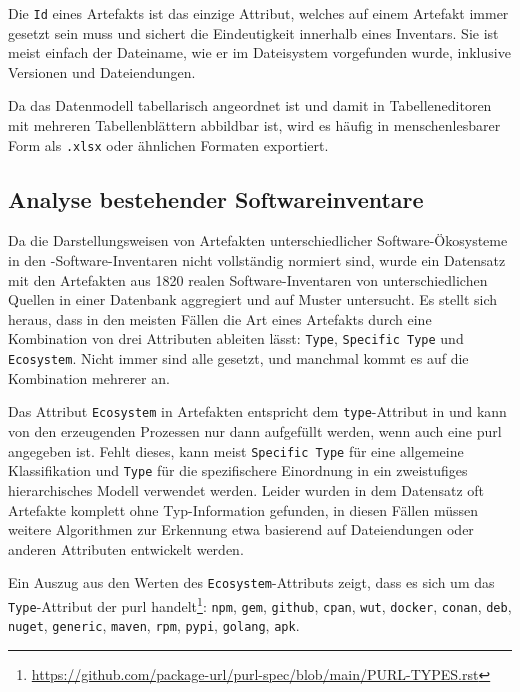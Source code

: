 Die \texttt{Id} eines Artefakts ist das einzige Attribut, welches auf einem Artefakt immer gesetzt sein muss und sichert die Eindeutigkeit innerhalb eines Inventars.
Sie ist meist einfach der Dateiname, wie er im Dateisystem vorgefunden wurde, inklusive Versionen und Dateiendungen.

Da das Datenmodell tabellarisch angeordnet ist und damit in Tabelleneditoren mit mehreren Tabellenblättern abbildbar ist, wird es häufig in menschenlesbarer Form als \texttt{.xlsx} oder ähnlichen Formaten exportiert.

\subsection{Analyse bestehender Softwareinventare}\label{subsec:analysis-ae-software-inventories}

Da die Darstellungsweisen von Artefakten unterschiedlicher Software-Ökosysteme in den \metaeffekt-Software-Inventaren nicht vollständig normiert sind, wurde ein Datensatz mit den Artefakten aus 1820 realen Software-Inventaren von unterschiedlichen Quellen in einer Datenbank aggregiert und auf Muster untersucht.
Es stellt sich heraus, dass in den meisten Fällen die Art eines Artefakts durch eine Kombination von drei Attributen ableiten lässt: \texttt{Type}, \texttt{Specific Type} und \texttt{Ecosystem}.
Nicht immer sind alle gesetzt, und manchmal kommt es auf die Kombination mehrerer an.

Das Attribut \texttt{Ecosystem} in Artefakten entspricht dem \texttt{type}-Attribut in  und kann von den erzeugenden Prozessen nur dann aufgefüllt werden, wenn auch eine \acrshort{purl} angegeben ist.
Fehlt dieses, kann meist \texttt{Specific Type} für eine allgemeine Klassifikation und \texttt{Type} für die spezifischere Einordnung in ein zweistufiges hierarchisches Modell verwendet werden.
Leider wurden in dem Datensatz oft Artefakte komplett ohne Typ-Information gefunden, in diesen Fällen müssen weitere Algorithmen zur Erkennung etwa basierend auf Dateiendungen oder anderen Attributen entwickelt werden.

Ein Auszug aus den Werten des \texttt{Ecosystem}-Attributs zeigt, dass es sich um das \texttt{Type}-Attribut der \acrshort{purl} handelt\footnote{\url{https://github.com/package-url/purl-spec/blob/main/PURL-TYPES.rst}}:
\texttt{npm}, \texttt{gem}, \texttt{github}, \texttt{cpan}, \texttt{wut}, \texttt{docker}, \texttt{conan}, \texttt{deb}, \texttt{nuget}, \texttt{generic}, \texttt{maven}, \texttt{rpm}, \texttt{pypi}, \texttt{golang}, \texttt{apk}.

